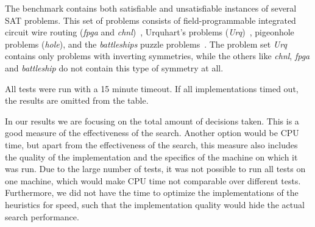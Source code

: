 	The benchmark contains both satisfiable and unsatisfiable instances of several SAT problems.
	This set of problems consists of field-programmable integrated circuit wire routing (\emph{fpga} and
	\emph{chnl})~\cite{nam2004comparative}, Urquhart's problems (\emph{Urq})~\cite{urquhart1987hard},
	pigeonhole problems (\emph{hole}), and the \emph{battleships}
	puzzle problems~\cite{sevenster2004battleships}.
	The problem set \emph{Urq} contains only problems with inverting symmetries, while the
	others like \emph{chnl}, \emph{fpga} and \emph{battleship} do not contain this type of symmetry
	at all\cite{devriendt2012symmetry}.

	All tests were run with a 15 minute timeout.
	If all implementations timed out, the results are omitted from the table.

	In our results we are focusing on the total amount of decisions taken.
	This is a good measure of the effectiveness of the search.
	Another option would be CPU time, but apart from the effectiveness of the search, this measure
	also includes the quality of the implementation and the specifics of the machine on which it was
	run.
	Due to the large number of tests, it was not possible to run all tests on one machine, which
	would make CPU time not comparable over different tests.
	Furthermore, we did not have the time to optimize the implementations of the heuristics for
	speed, such that the implementation quality would hide the actual search performance.
